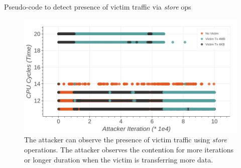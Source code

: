 \begin{minipage}{\textwidth}
    
    \captionsetup{type=lstlisting}
    \caption{Pseudo-code to detect presence of victim traffic via \textit{store} ops}
    \label{lst:timing-victim-with-stores}
\end{minipage}

\begin{figure}[!htb]
    \centering
    \includegraphics[width=\columnwidth]{figures/interconnect-sc/store-ops/cpu_store_victim_observation.png}
    \caption{The attacker can observe the presence of victim traffic using \textit{store} operations.
    The attacker observes the contention for more iterations or longer duration when the victim is transferring more data.}
    \label{fig:cpu-store-victim-observation}
\end{figure}
